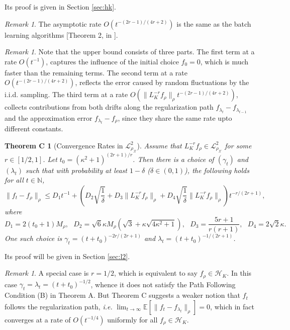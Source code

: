 \documentclass[twoside,11pt]{amsart}
\theoremstyle{theorem}
\newtheorem*{thmc}{Theorem C}
\theoremstyle{definition}
\theoremstyle{remark}
\newtheorem{rem}[thm]{Remark}
\newcommand{\DS}{\displaystyle}
\def\E{{\mathbb E}}        %
\def\L{{\mathscr L}}
\def\L2{{\mathscr L}^2_{\rho_\X}}
\def\M{M_\rho}
\def\H{{\mathscr H}}
\def\X{{\mathscr X}}
\def\N{{\mathbb N}}
\def\t{t_0}
\def\la{\lambda}
\def\ka{\kappa}
\def\ga{\gamma}
\begin{document}
Its proof is given in Section \ref{sec:hk}. 

\begin{rem}
The asymptotic rate $O(t^{-(2r-1)/(4r+2)})$ is the same as the batch learning algorithms [Theorem 2, in ]. 
\end{rem}

\begin{rem}
Note that the upper bound consists of three parts. 
The first term at a rate $O(t^{-1})$, captures the influence of the initial choice $f_0=0$, which is much faster than the remaining terms.
The second term at a rate $O(t^{-(2r-1)/(4r+2)})$, reflects the error caused by random fluctuations by the i.i.d. sampling. 
The third term at a rate $O( \| L^{-r}_K f_\rho \|_\rho t^{-(2r-1)/(4r+2)})$, collects contributions from both drifts along the 
regularization path $f_{\la_t}-f_{\la_{t-1}}$ and the approximation error $f_{\la_t}-f_\rho$, since they share the same rate upto different constants. 
\end{rem}


\begin{thmc}[Convergence Rates in $\L2$]
Assume that $L_K^{-r} f_\rho\in \L2$ for some $r\in [1/2,1]$. Let $\DS \t=(\kappa^2+1)^{(2r+1)/r}$.
Then there is a choice of $(\ga_t)$ and $(\la_t)$ such that with probability at least $1-\delta$ ($\delta\in (0,1)$), 
the following holds for all $t\in \N$, 
\[ \|f_t - f_\rho \|_\rho \leq D_1 t^{-1} + (D_2 \sqrt{\frac{1}{\delta}} + D_3 \| L^{-r}_K f_\rho\|_\rho 
+D_4 \sqrt{\frac{1}{\delta}} \| L^{-r}_K f_\rho\|_\rho) t^{-r/(2r+1)}, \]
where 
\[ D_1 = 2(\t+1) M_\rho, \ \ \  D_2 = \sqrt{6} \ka \M (\sqrt{3}  + \ka \sqrt{4\ka^2+1} ),\ \ \  D_3=\frac{5r+1}{r(r+1)}, \ \ \ D_4=2\sqrt{2}\ka. \]
One such choice is $\ga_t = (t+\t)^{-2r/(2r+1)}$ and $\la_t = (t+\t)^{-1/(2r+1)}$.
\end{thmc}

Its proof will be given in Section \ref{sec:l2}.

\begin{rem}
A special case is $r=1/2$, which is equivalent to say $f_\rho \in \H_K$. In this case $\ga_t = \la_t = (t+\t)^{-1/2}$, whence it
does not satisfy the Path Following Condition (B) in Theorem A. But Theorem C suggests a weaker notion that $f_t$ follows the regularization path,
\emph{i.e.} $\lim_{t\to \infty} \E[\|f_t - f_{\la_t}\|_\rho] = 0$, which in fact converges at a rate of $O(t^{-1/4})$ uniformly for all $f_\rho \in \H_K$. 
\end{rem}
\end{document}
